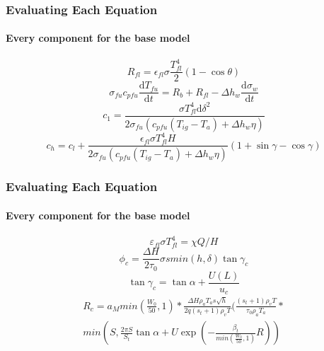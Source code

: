 \documentclass{beamer}
\begin{document}
\begin{frame}
	\frametitle{Evaluating Each Equation}
	\framesubtitle{Every component for the base model}
	
		\begin{equation}
	R_{fl} = \epsilon_{fl} \sigma \frac {T^{4}_{fl}} {2} (1 - \cos \theta) \label{flame_base_2007}
	\end{equation}
	\begin{equation}
	\sigma _ {fu} c _{pfu} \frac {\mathrm{d} T_{fu}} {\mathrm{d} t} = R_b + R_{fl} - \Delta h_w \frac {\mathrm{d} \sigma _ w } {\mathrm {d} t} \label{preheating sub mode 2007}
	\end{equation}
	\begin{equation}
	c_1 = \frac {\sigma T^{4}_{fl} \mathrm {d} \delta ^ 2} {2 \sigma _ {fu} (c_{pfu}(T_{ig} - T_a) + \Delta h _ w \eta)} \label{low regime ros}
	\end{equation}
	\begin{equation}
	c_h = c_l  + \frac {\epsilon _{fl} \sigma T^{4}_{fl} H} {2 \sigma _ {fu} (c_{pfu}(T_{ig} - T_a) + \Delta h _ w \eta)} (1 + \sin \gamma - \cos \gamma) \label{high speed regimes}
	\end{equation}
	
	
\end{frame}


\begin{frame}
	\frametitle{Evaluating Each Equation}
	\framesubtitle{Every component for the base model}
	\begin{equation}
	\varepsilon_{fl} \sigma T^{4}_{fl} = \chi Q / H \label{high speed regimes 2007}
	\end{equation}
	\begin{equation}
	\phi _ c = \frac {\Delta H} {2 \tau _ 0} \sigma s min(h, \delta) \tan \gamma _ c \label{convection intro}
	\end{equation}
	\begin{equation}
	\tan \gamma _ {c} = \tan \alpha + \frac {U(L)} {u_{c}}
	\end{equation}
\begin{equation}
	\label{convective component}
	\begin{split}
	R_c = a_M min(\frac {W_0}{50}, 1)* \frac {\Delta H \rho _ a T_a s \sqrt{h}}{2q(s_t + 1) \rho _ v T} (\frac {(s_t + 1) \rho _ v T}{\tau _ 0 \rho _ a T_a} * \\ min(S, \frac {2 \pi S}{S_t} \tan \alpha + U \exp (- \frac {\beta _ t}{min(\frac{W_0}{50}, 1)} R))
	\end{split}
\end{equation}
\end{frame}
\end{document}

